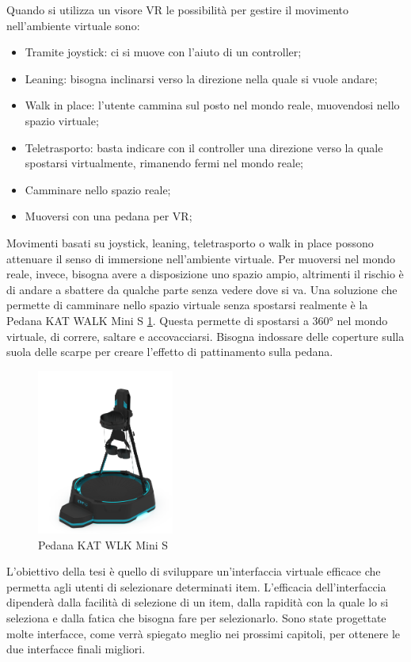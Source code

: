 \documentclass[target=bach,aauheader=]{thud}
\begin{document}
\newpage
Quando si utilizza un visore VR le possibilità per gestire il movimento nell'ambiente virtuale sono:
\begin{itemize}
    \item Tramite joystick: ci si muove con l'aiuto di un controller;
    \item Leaning: bisogna inclinarsi verso la direzione nella quale si vuole andare;
    \item Walk in place: l'utente cammina sul posto nel mondo reale, muovendosi nello spazio virtuale;
    \item Teletrasporto: basta indicare con il controller una direzione verso la quale spostarsi virtualmente, rimanendo fermi nel mondo reale;
    \item Camminare nello spazio reale;
    \item Muoversi con una pedana per VR;
\end{itemize} 

Movimenti basati su joystick, leaning, teletrasporto o walk in place possono attenuare il senso di immersione nell'ambiente virtuale.
Per muoversi nel mondo reale, invece, bisogna avere a disposizione uno spazio ampio, altrimenti il rischio è di andare a sbattere da qualche parte senza vedere dove si va.
Una soluzione che permette di camminare nello spazio virtuale senza spostarsi realmente è la Pedana KAT WALK Mini S \ref{fig:kat_walk}.
Questa permette di spostarsi a 360° nel mondo virtuale, di correre, saltare e accovacciarsi. 
Bisogna indossare delle coperture sulla suola delle scarpe per creare l'effetto di pattinamento sulla pedana.    

\begin{figure}[h]
    \centering
    \includegraphics[width=0.40\textwidth]{kat_walk_mini}
    \caption{Pedana KAT WLK Mini S}
    \label{fig:kat_walk}
\end{figure}

L'obiettivo della tesi è quello di sviluppare un'interfaccia virtuale efficace che permetta agli utenti di selezionare determinati item.
L'efficacia dell'interfaccia dipenderà dalla facilità di selezione di un item, dalla rapidità con la quale lo si seleziona e dalla fatica che bisogna fare per selezionarlo.
Sono state progettate molte interfacce, come verrà spiegato meglio nei prossimi capitoli, per ottenere le due interfacce finali migliori. \\
\end{document}
